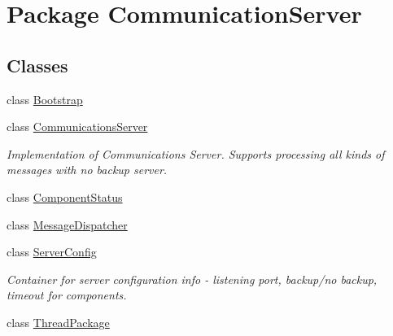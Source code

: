\hypertarget{namespace_communication_server}{}\section{Package Communication\+Server}
\label{namespace_communication_server}
\subsection*{Classes}
\begin{DoxyCompactItemize}
\item 
class \hyperlink{class_communication_server_1_1_bootstrap}{Bootstrap}
\item 
class \hyperlink{class_communication_server_1_1_communications_server}{Communications\+Server}
\begin{DoxyCompactList}\small\item\em Implementation of Communications Server. Supports processing all kinds of messages with no backup server. \end{DoxyCompactList}\item 
class \hyperlink{class_communication_server_1_1_component_status}{Component\+Status}
\item 
class \hyperlink{class_communication_server_1_1_message_dispatcher}{Message\+Dispatcher}
\item 
class \hyperlink{class_communication_server_1_1_server_config}{Server\+Config}
\begin{DoxyCompactList}\small\item\em Container for server configuration info -\/ listening port, backup/no backup, timeout for components. \end{DoxyCompactList}\item 
class \hyperlink{class_communication_server_1_1_thread_package}{Thread\+Package}
\end{DoxyCompactItemize}
